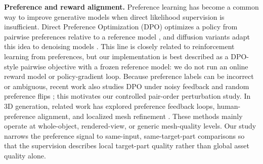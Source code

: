 \documentclass[10pt,twocolumn,letterpaper]{article}
\begin{document}
\noindent\textbf{Preference and reward alignment.}
Preference learning has become a common way to improve generative models when direct likelihood supervision is insufficient. Direct Preference Optimization (DPO) optimizes a policy from pairwise preferences relative to a reference model \cite{rafailov2023direct}, and diffusion variants adapt this idea to denoising models \cite{wallace2024diffusiondpo}. This line is closely related to reinforcement learning from preferences, but our implementation is best described as a DPO-style pairwise objective with a frozen reference model: we do not run an online reward model or policy-gradient loop. Because preference labels can be incorrect or ambiguous, recent work also studies DPO under noisy feedback and random preference flips \cite{raychowdhury2024robustdpo}; this motivates our controlled pair-order perturbation study. In 3D generation, related work has explored preference feedback loops, human-preference alignment, and localized mesh refinement \cite{li2026circulardpo,zhou2025dreamdpoaligningtextto3dgeneration,liu2025meshrftenhancingmeshgeneration}. These methods mainly operate at whole-object, rendered-view, or generic mesh-quality levels. Our study narrows the preference signal to same-input, same-target-part comparisons so that the supervision describes local target-part quality rather than global asset quality alone.
\end{document}
